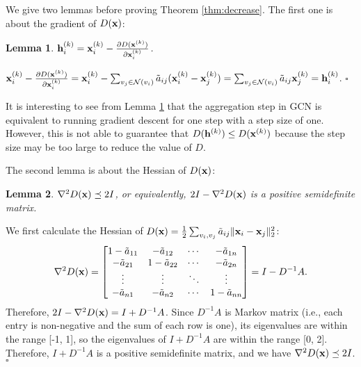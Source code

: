 \documentclass{article}
\newtheorem{lemma}{Lemma}
\newenvironment{proof}{{\noindent\it Proof.}\quad}{\hfill $\square$\par}
\begin{document}
		We give two lemmas before proving Theorem \ref{thm:decrease}.
		The first one is about the gradient of $D({\bf x})$:
		\begin{lemma}
		\label{lemma:3}
			${\bf h}_i^{(k)} = {\bf x}_i^{(k)} - \frac{\partial D({\bf x}^{(k)})}{\partial {\bf x}_i^{(k)}}$.
		\end{lemma}
		
		\begin{proof}
			${\bf x}_i^{(k)} - \frac{\partial D({\bf x}^{(k)})}{\partial {\bf x}_i^{(k)}} = {\bf x}_i^{(k)} - \sum_{v_j \in \mathcal N(v_i)} \tilde a_{ij} ({\bf x}_i^{(k)} - {\bf x}_j^{(k)}) = \sum_{v_j \in \mathcal N(v_i)} \tilde a_{ij} {\bf x}_j^{(k)} = {\bf h}_i^{(k)}$.
		\end{proof}
		
		It is interesting to see from Lemma \ref{lemma:3} that the aggregation step in GCN is equivalent to running gradient descent for one step with a step size of one.
		However, this is not able to guarantee that $D({\bf h}^{(k)}) \leq D({\bf x}^{(k)})$ because the step size may be too large to reduce the value of $D$.
		
		The second lemma is about the Hessian of $D({\bf x})$:
		
		\begin{lemma}
		\label{lemma:4}
			$\nabla^2 D({\bf x}) \preceq 2I$, or equivalently, $2I - \nabla^2 D({\bf x})$ is a positive semidefinite matrix.
		\end{lemma}
		
		\begin{proof}
			We first calculate the Hessian of $D({\bf x}) = \frac{1}{2} \sum_{v_i, v_j} \tilde a_{ij} \| {\bf x}_i - {\bf x}_j \|_2^2$:
			\begin{equation}
				\nabla^2 D({\bf x}) =
				\left[
					\begin{matrix}
						1-\tilde a_{11} & -\tilde a_{12} & \cdots & -\tilde a_{1n} \\
						-\tilde a_{21} & 1-\tilde a_{22} & \cdots & -\tilde a_{2n} \\
						\vdots & \vdots & \ddots & \vdots \\
						-\tilde a_{n1} & -\tilde a_{n2} & \cdots & 1-\tilde a_{nn} \\
					\end{matrix}
				\right]
				= I - D^{-1}A.
			\end{equation}
			Therefore, $2I - \nabla^2 D({\bf x}) = I + D^{-1}A$.
			Since $D^{-1}A$ is Markov matrix (i.e., each entry is non-negative and the sum of each row is one), its eigenvalues are within the range [-1, 1], so the eigenvalues of $I + D^{-1}A$ are within the range [0, 2].
			Therefore, $I + D^{-1}A$ is a positive semidefinite matrix, and we have $\nabla^2 D({\bf x}) \preceq 2I$.
		\end{proof}
		
\end{document}
